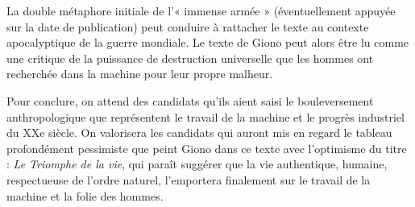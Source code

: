 {La double métaphore initiale de l'« immense armée » (éventuellement appuyée sur la
date de publication) peut conduire à rattacher le texte au contexte apocalyptique de la
guerre mondiale. Le texte de Giono peut alors être lu comme une critique de la
puissance de destruction universelle que les hommes ont recherchée dans la machine
pour leur propre malheur.

Pour conclure, on attend des candidats qu’ils aient saisi le bouleversement
anthropologique que représentent le travail de la machine et le progrès industriel du
XXe siècle. On valorisera les candidats qui auront mis en regard le tableau
profondément pessimiste que peint Giono dans ce texte avec l’optimisme du titre : \emph{Le Triomphe de la vie}, qui paraît suggérer que la vie authentique, humaine, respectueuse
de l’ordre naturel, l’emportera finalement sur le travail de la machine et la folie des
hommes.}%
